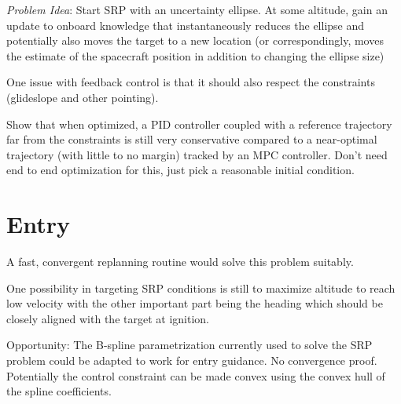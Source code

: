 \documentclass[10pt,a4paper]{article}
\begin{document}
	\textit{Problem Idea}: Start SRP with an uncertainty ellipse. At some altitude, gain an update to onboard knowledge that instantaneously reduces the ellipse and potentially also moves the target to a new location (or correspondingly, moves the estimate of the spacecraft position in addition to changing the ellipse size)
	
	One issue with feedback control is that it should also respect the constraints (glideslope and other pointing). 
	
	Show that when optimized, a PID controller coupled with a reference trajectory far from the constraints is still very conservative compared to a near-optimal trajectory (with little to no margin) tracked by an MPC controller. Don't need end to end optimization for this, just pick a reasonable initial condition. 
	
	
	
	\section{Entry}
	A fast, convergent replanning routine would solve this problem suitably. 
	
		One possibility in targeting SRP conditions is still to maximize altitude to reach low velocity with the other important part being the heading which should be closely aligned with the target at ignition.
		
		Opportunity: The B-spline parametrization currently used to solve the SRP problem could be adapted to work for entry guidance. No convergence proof. Potentially the control constraint can be made convex using the convex hull of the spline coefficients. 
	
\end{document}
